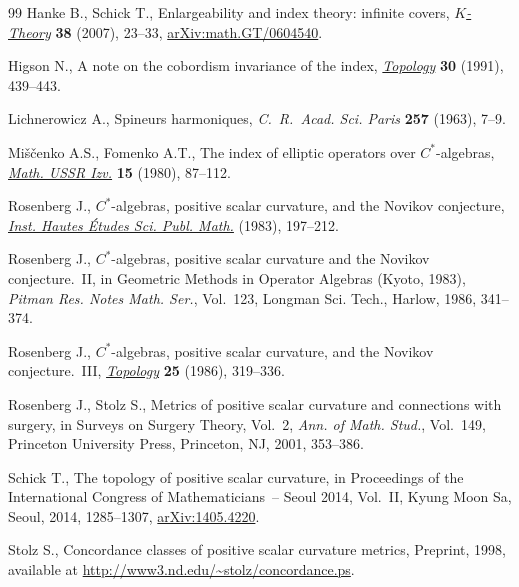 \documentclass[11pt]{article}
\numberwithin{equation}{section}
\begin{document}
\begin{thebibliography}{99}
Hanke B., Schick T., Enlargeability and index theory: infinite covers,
 \href{https://doi.org/10.1007/s10977-007-9004-3}{\textit{$K$-Theory}} \textbf{38} (2007), 23--33, \href{https://arxiv.org/abs/math.GT/0604540}{arXiv:math.GT/0604540}.

Higson N., A note on the cobordism invariance of the index, \href{https://doi.org/10.1016/0040-9383(91)90024-X}{\textit{Topology}}
 \textbf{30} (1991), 439--443.

Lichnerowicz A., Spineurs harmoniques, \textit{C.~R.~Acad. Sci. Paris}
 \textbf{257} (1963), 7--9.

Mi\v{s}\v{c}enko A.S., Fomenko A.T., The index of elliptic operators over
 {$C^{\ast} $}-algebras, \href{https://doi.org/10.1070/IM1980v015n01ABEH001207}{\textit{Math. USSR Izv.}} \textbf{15} (1980), 87--112.

Rosenberg J., {$C^{\ast} $}-algebras, positive scalar curvature, and the
 {N}ovikov conjecture, \href{https://doi.org/10.1007/BF02953775}{\textit{Inst. Hautes \'Etudes Sci. Publ. Math.}}
 (1983), 197--212.

Rosenberg J., {$C^\ast$}-algebras, positive scalar curvature and the {N}ovikov
 conjecture.~{II}, in Geometric Methods in Operator Algebras ({K}yoto, 1983),
 \textit{Pitman Res. Notes Math. Ser.}, Vol.~123, Longman Sci. Tech., Harlow,
 1986, 341--374.

Rosenberg J., {$C^\ast$}-algebras, positive scalar curvature, and the {N}ovikov
 conjecture.~{III}, \href{https://doi.org/10.1016/0040-9383(86)90047-9}{\textit{Topology}} \textbf{25} (1986), 319--336.

Rosenberg J., Stolz S., Metrics of positive scalar curvature and connections
 with surgery, in Surveys on Surgery Theory, {V}ol.~2, \textit{Ann. of Math.
 Stud.}, Vol.~149, Princeton University Press, Princeton, NJ, 2001, 353--386.

Schick T., The topology of positive scalar curvature, in Proceedings of the
 {I}nternational {C}ongress of {M}a\-the\-maticians~-- {S}eoul 2014, {V}ol.~{II},
 Kyung Moon Sa, Seoul, 2014, 1285--1307, \href{https://arxiv.org/abs/1405.4220}{arXiv:1405.4220}.

Stolz S., Concordance classes of positive scalar curvature metrics, {P}reprint,
 1998, available at \url{http://www3.nd.edu/~stolz/concordance.ps}.


\end{thebibliography}
\end{document}
